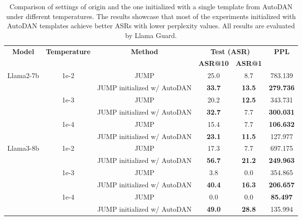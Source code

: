 \renewcommand{\arraystretch}{1.5}
\setlength{\tabcolsep}{5pt} %
\captionsetup[table]{justification=raggedright, singlelinecheck=false}
\begin{table*}[!t]
    \centering
    \small
    \begin{tabular}{cccccc}  %
    \hline
    \multirow{2}{*}{\textbf{Model}} & \multirow{2}{*}{\textbf{Temperature}} & \multirow{2}{*}{\textbf{Method}} & \multicolumn{2}{c}{\textbf{Test (ASR)}} & \multirow{2}{*}{\textbf{PPL}} \\ 
    \cline{4-5}
    &  &  & \textbf{ASR@10} & \textbf{ASR@1} &  \\
    \hline
    \multirow{6}{*}{Llama2-7b} & \multirow{2}{*}{1e-2} & JUMP & 25.0 & 8.7 & 783.139 \\
     &  & JUMP initialized w/ AutoDAN & \textbf{33.7} & \textbf{13.5} & \textbf{279.736} \\
    \cline{2-6}
    & \multirow{2}{*}{1e-3} & JUMP & 20.2 & \textbf{12.5} & 343.731 \\
     &  & JUMP initialized w/ AutoDAN & \textbf{32.7}  & 7.7 & \textbf{300.031} \\
     \cline{2-6}
    & \multirow{2}{*}{1e-4} & JUMP & 15.4 & 7.7 & \textbf{106.632} \\
     &  & JUMP initialized w/ AutoDAN & \textbf{23.1} & \textbf{11.5} & 127.977 \\
    \hline
    \multirow{6}{*}{Llama3-8b} & \multirow{2}{*}{1e-2} & JUMP & 17.3 & 7.7 & 697.175 \\
     &  & JUMP initialized w/ AutoDAN & \textbf{56.7} & \textbf{21.2} & \textbf{249.963} \\
    \cline{2-6}
    & \multirow{2}{*}{1e-3} & JUMP & 3.8 & 0.0 & 354.865 \\
     &  & JUMP initialized w/ AutoDAN & \textbf{40.4} & \textbf{16.3} & \textbf{206.657} \\
     \cline{2-6}
    & \multirow{2}{*}{1e-4} & JUMP & 0.0 & 0.0 & \textbf{85.497} \\
     &  & JUMP initialized w/ AutoDAN & \textbf{49.0} & \textbf{28.8} & 135.994 \\
    \hline
    \end{tabular}

    \caption{Comparison of settings of origin and the one initialized with a single template from AutoDAN under different temperatures. The results showcase that most of the experiments initialized with AutoDAN templates achieve better ASRs with lower perplexity values. All results are evaluated by Llama Guard.}
    \label{tab:mitigate_tradeoff}
\end{table*}